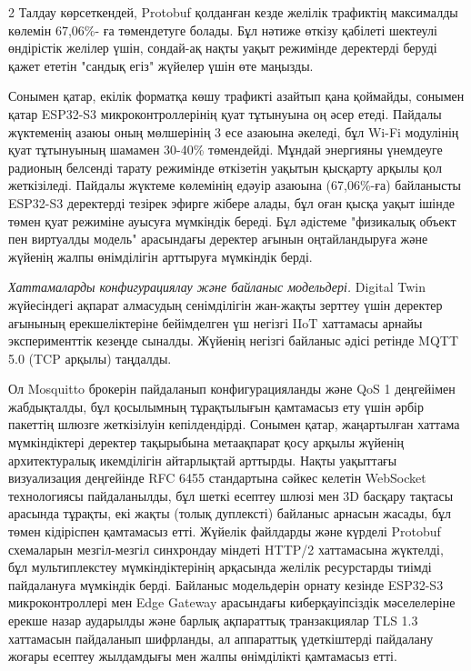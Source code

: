 \begin{multicols}{2}
Талдау көрсеткендей, Protobuf қолданған кезде желілік трафиктің
максималды көлемін 67,06\%- ға төмендетуге болады. Бұл нәтиже өткізу
қабілеті шектеулі өндірістік желілер үшін, сондай-ақ нақты уақыт
режимінде деректерді беруді қажет ететін "сандық егіз" жүйелер үшін өте
маңызды.

Сонымен қатар, екілік форматқа көшу трафикті азайтып қана қоймайды,
сонымен қатар ESP32-S3 микроконтроллерінің қуат тұтынуына оң әсер етеді.
Пайдалы жүктеменің азаюы оның мөлшерінің 3 есе азаюына әкеледі, бұл
Wi-Fi модулінің қуат тұтынуының шамамен 30-40\% төмендейді. Мұндай
энергияны үнемдеуге радионың белсенді тарату режимінде өткізетін уақытын
қысқарту арқылы қол жеткізіледі. Пайдалы жүктеме көлемінің едәуір
азаюына (67,06\%-ға) байланысты ESP32-S3 деректерді тезірек эфирге
жібере алады, бұл оған қысқа уақыт ішінде төмен қуат режиміне ауысуға
мүмкіндік береді. Бұл әдістеме "физикалық объект пен виртуалды модель"
арасындағы деректер ағынын оңтайландыруға және жүйенің жалпы өнімділігін
арттыруға мүмкіндік берді.

\emph{Хаттамаларды конфигурациялау және байланыс модельдері.} Digital
Twin жүйесіндегі ақпарат алмасудың сенімділігін жан-жақты зерттеу үшін
деректер ағынының ерекшеліктеріне бейімделген үш негізгі IIoT хаттамасы
арнайы эксперименттік кезеңде сыналды. Жүйенің негізгі байланыс әдісі
ретінде MQTT 5.0 (TCP арқылы) таңдалды.

Ол Mosquitto брокерін пайдаланып конфигурацияланды және QoS 1 деңгейімен
жабдықталды, бұл қосылымның тұрақтылығын қамтамасыз ету үшін әрбір
пакеттің шлюзге жеткізілуін кепілдендірді. Сонымен қатар, жаңартылған
хаттама мүмкіндіктері деректер тақырыбына метаақпарат қосу арқылы
жүйенің архитектуралық икемділігін айтарлықтай арттырды. Нақты уақыттағы
визуализация деңгейінде RFC 6455 стандартына сәйкес келетін WebSocket
технологиясы пайдаланылды, бұл шеткі есептеу шлюзі мен 3D басқару
тақтасы арасында тұрақты, екі жақты (толық дуплексті) байланыс арнасын
жасады, бұл төмен кідіріспен қамтамасыз етті. Жүйелік файлдарды және
күрделі Protobuf схемаларын мезгіл-мезгіл синхрондау міндеті HTTP/2
хаттамасына жүктелді, бұл мультиплекстеу мүмкіндіктерінің арқасында
желілік ресурстарды тиімді пайдалануға мүмкіндік берді. Байланыс
модельдерін орнату кезінде ESP32-S3 микроконтроллері мен Edge Gateway
арасындағы киберқауіпсіздік мәселелеріне ерекше назар аударылды және
барлық ақпараттық транзакциялар TLS 1.3 хаттамасын пайдаланып шифрланды,
ал аппараттық үдеткіштерді пайдалану жоғары есептеу жылдамдығы мен жалпы
өнімділікті қамтамасыз етті.


\end{multicols}
